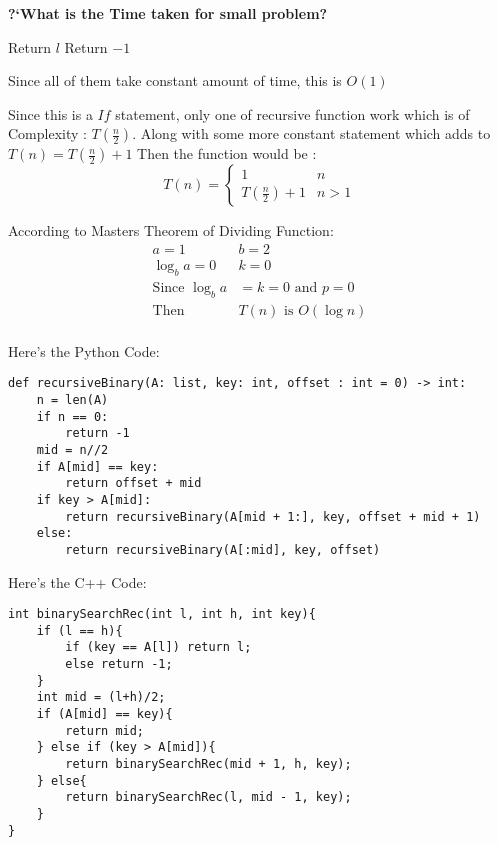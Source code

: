 \documentclass[11pt, a4paper]{article}
\begin{document}
\bigskip
\textbf{?`What is the Time taken for small problem?} \\
\begin{algorithmic}
            \State Return $l$
        \Else
            \State Return $-1$
        \EndIf
    \EndIf
\end{algorithmic}

Since all of them take constant amount of time, this is $O(1)$

Since this is a $If$ statement, only one of recursive function work which is of Complexity : $T(\frac{n}{2})$.
Along with some more constant statement which adds to $T(n) = T(\frac{n}{2}) + 1$
Then the function would be : 
\begin{equation}\label {recurrenceRelation}
    T(n) = 
    \begin{cases}
        1 & n \\
        T\left(\frac{n}{2}\right) + 1 & n > 1
    \end{cases}
\end{equation}

According to Masters Theorem of Dividing Function:
\begin{align*}
    a = 1 & b = 2\\
    \log_b{a} = 0 & k = 0\\
    \text{Since } \log_b{a} &= k = 0 \text{ and } p = 0\\
    \text{Then } &T(n) \text{ is } O(\log{n})\\
\end{align*}

Here's the Python Code:
\begin{verbatim}
def recursiveBinary(A: list, key: int, offset : int = 0) -> int:
    n = len(A)
    if n == 0:
        return -1
    mid = n//2
    if A[mid] == key:
        return offset + mid
    if key > A[mid]:
        return recursiveBinary(A[mid + 1:], key, offset + mid + 1)
    else: 
        return recursiveBinary(A[:mid], key, offset)
\end{verbatim}

Here's the C++ Code:
\begin{verbatim}
int binarySearchRec(int l, int h, int key){
    if (l == h){
        if (key == A[l]) return l;
        else return -1;
    }
    int mid = (l+h)/2;
    if (A[mid] == key){
        return mid;
    } else if (key > A[mid]){
        return binarySearchRec(mid + 1, h, key);
    } else{
        return binarySearchRec(l, mid - 1, key);
    }
}
\end{verbatim}
\end{document}
